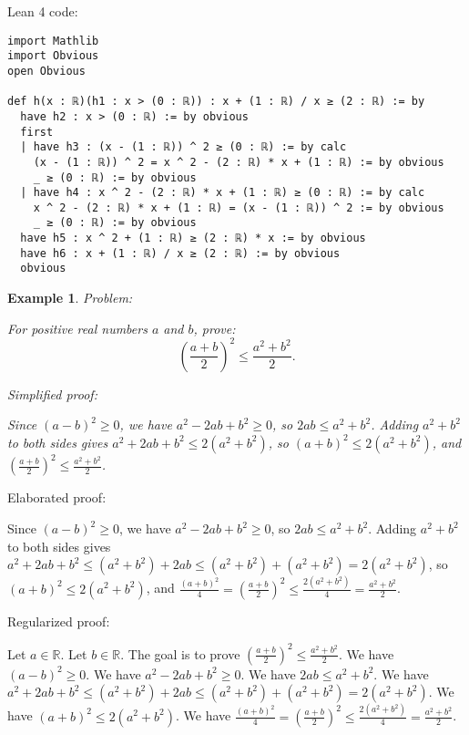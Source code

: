 \documentclass{article}
\newtheorem{example}{Example}
\begin{document}
Lean 4 code:
\begin{tcolorbox}[colback=white!10, width=\linewidth]
\begin{lstlisting}[language=Lean4]
import Mathlib
import Obvious
open Obvious

def h(x : ℝ)(h1 : x > (0 : ℝ)) : x + (1 : ℝ) / x ≥ (2 : ℝ) := by
  have h2 : x > (0 : ℝ) := by obvious
  first
  | have h3 : (x - (1 : ℝ)) ^ 2 ≥ (0 : ℝ) := by calc
    (x - (1 : ℝ)) ^ 2 = x ^ 2 - (2 : ℝ) * x + (1 : ℝ) := by obvious
    _ ≥ (0 : ℝ) := by obvious
  | have h4 : x ^ 2 - (2 : ℝ) * x + (1 : ℝ) ≥ (0 : ℝ) := by calc
    x ^ 2 - (2 : ℝ) * x + (1 : ℝ) = (x - (1 : ℝ)) ^ 2 := by obvious
    _ ≥ (0 : ℝ) := by obvious
  have h5 : x ^ 2 + (1 : ℝ) ≥ (2 : ℝ) * x := by obvious
  have h6 : x + (1 : ℝ) / x ≥ (2 : ℝ) := by obvious
  obvious

\end{lstlisting}
\end{tcolorbox}


\begin{example}
Problem:
\begin{tcolorbox}[colback=yellow!10, width=\linewidth]
For positive real numbers $a$ and $b$, prove:
    $$\left(\frac{a+b}{2}\right)^2 \leq \frac{a^2+b^2}{2}.$$
\end{tcolorbox}

Simplified proof:
\begin{tcolorbox}[colback=blue!10, width=\linewidth]
Since $(a-b)^2 \ge 0$, we have $a^2 - 2ab + b^2 \ge 0$, so $2ab \leq a^2 + b^2$.
Adding $a^2+b^2$ to both sides gives $a^2 + 2ab + b^2 \leq 2(a^2+b^2)$, so $(a+b)^2 \leq 2(a^2+b^2)$, and $\left(\frac{a+b}{2}\right)^2 \leq \frac{a^2+b^2}{2}$.
\end{tcolorbox}
\end{example}

Elaborated proof:
\begin{tcolorbox}[colback=green!10, width=\linewidth]
Since $(a-b)^2 \ge 0$, we have $a^2 - 2ab + b^2 \ge 0$, so $2ab \leq a^2 + b^2$.
Adding $a^2+b^2$ to both sides gives $a^2 + 2ab + b^2 \leq (a^2 + b^2) + 2ab \leq (a^2+b^2) + (a^2+b^2) = 2(a^2+b^2)$, so $(a+b)^2 \leq 2(a^2+b^2)$, and $\frac{(a+b)^2}{4} = \left(\frac{a+b}{2}\right)^2 \leq \frac{2(a^2+b^2)}{4} = \frac{a^2+b^2}{2}$.
\end{tcolorbox}

Regularized proof:
\begin{tcolorbox}[colback=red!10, width=\linewidth]
Let $a\in\mathbb{R}$.
Let $b\in\mathbb{R}$.
The goal is to prove ${\left(\frac{a+b}{2}\right)}^2 \leq \frac{a^2+b^2}{2}$.
We have ${(a-b)}^2 \ge 0$.
We have $a^2 - 2ab + b^2 \ge 0$.
We have $2ab \leq a^2 + b^2$.
We have $a^2 + 2ab + b^2 \leq (a^2 + b^2) + 2ab \leq (a^2+b^2) + (a^2+b^2) = 2(a^2+b^2)$.
We have ${(a+b)}^2 \leq 2(a^2+b^2)$.
We have $\frac{{(a+b)}^2}{4} = {\left(\frac{a+b}{2}\right)}^2 \leq \frac{2(a^2+b^2)}{4} = \frac{a^2+b^2}{2}$.
\end{tcolorbox}
\end{document}
